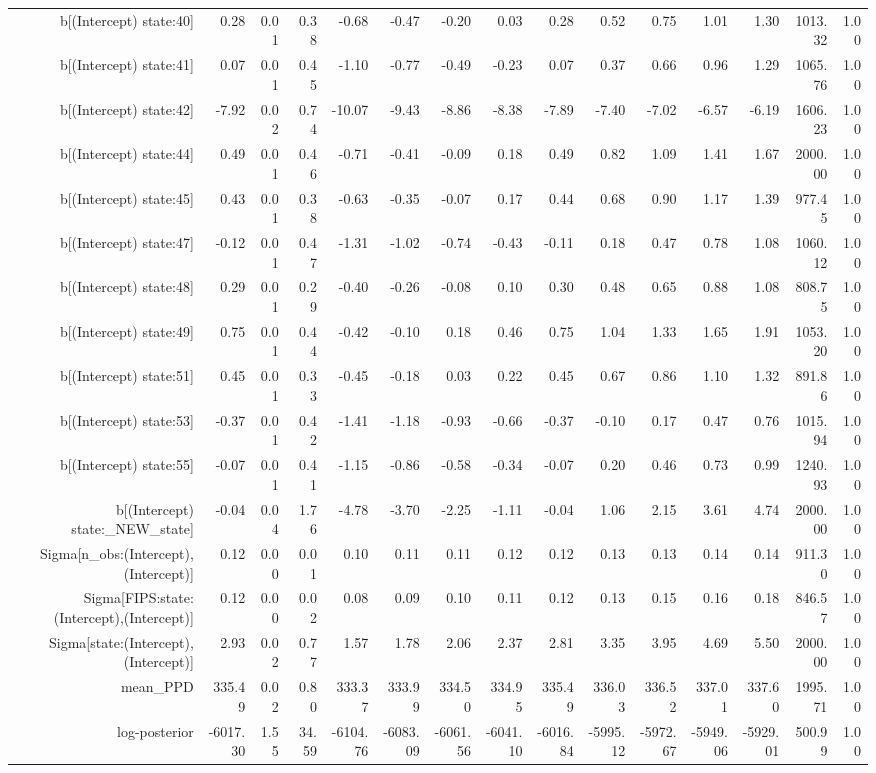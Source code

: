 \begin{table}[ht]
\begin{tabular}{rrrrrrrrrrrrrrr}
  b[(Intercept) state:40] & 0.28 & 0.01 & 0.38 & -0.68 & -0.47 & -0.20 & 0.03 & 0.28 & 0.52 & 0.75 & 1.01 & 1.30 & 1013.32 & 1.00 \\ 
  b[(Intercept) state:41] & 0.07 & 0.01 & 0.45 & -1.10 & -0.77 & -0.49 & -0.23 & 0.07 & 0.37 & 0.66 & 0.96 & 1.29 & 1065.76 & 1.00 \\ 
  b[(Intercept) state:42] & -7.92 & 0.02 & 0.74 & -10.07 & -9.43 & -8.86 & -8.38 & -7.89 & -7.40 & -7.02 & -6.57 & -6.19 & 1606.23 & 1.00 \\ 
  b[(Intercept) state:44] & 0.49 & 0.01 & 0.46 & -0.71 & -0.41 & -0.09 & 0.18 & 0.49 & 0.82 & 1.09 & 1.41 & 1.67 & 2000.00 & 1.00 \\ 
  b[(Intercept) state:45] & 0.43 & 0.01 & 0.38 & -0.63 & -0.35 & -0.07 & 0.17 & 0.44 & 0.68 & 0.90 & 1.17 & 1.39 & 977.45 & 1.00 \\ 
  b[(Intercept) state:47] & -0.12 & 0.01 & 0.47 & -1.31 & -1.02 & -0.74 & -0.43 & -0.11 & 0.18 & 0.47 & 0.78 & 1.08 & 1060.12 & 1.00 \\ 
  b[(Intercept) state:48] & 0.29 & 0.01 & 0.29 & -0.40 & -0.26 & -0.08 & 0.10 & 0.30 & 0.48 & 0.65 & 0.88 & 1.08 & 808.75 & 1.00 \\ 
  b[(Intercept) state:49] & 0.75 & 0.01 & 0.44 & -0.42 & -0.10 & 0.18 & 0.46 & 0.75 & 1.04 & 1.33 & 1.65 & 1.91 & 1053.20 & 1.00 \\ 
  b[(Intercept) state:51] & 0.45 & 0.01 & 0.33 & -0.45 & -0.18 & 0.03 & 0.22 & 0.45 & 0.67 & 0.86 & 1.10 & 1.32 & 891.86 & 1.00 \\ 
  b[(Intercept) state:53] & -0.37 & 0.01 & 0.42 & -1.41 & -1.18 & -0.93 & -0.66 & -0.37 & -0.10 & 0.17 & 0.47 & 0.76 & 1015.94 & 1.00 \\ 
  b[(Intercept) state:55] & -0.07 & 0.01 & 0.41 & -1.15 & -0.86 & -0.58 & -0.34 & -0.07 & 0.20 & 0.46 & 0.73 & 0.99 & 1240.93 & 1.00 \\ 
  b[(Intercept) state:\_NEW\_state] & -0.04 & 0.04 & 1.76 & -4.78 & -3.70 & -2.25 & -1.11 & -0.04 & 1.06 & 2.15 & 3.61 & 4.74 & 2000.00 & 1.00 \\ 
  Sigma[n\_obs:(Intercept),(Intercept)] & 0.12 & 0.00 & 0.01 & 0.10 & 0.11 & 0.11 & 0.12 & 0.12 & 0.13 & 0.13 & 0.14 & 0.14 & 911.30 & 1.00 \\ 
  Sigma[FIPS:state:(Intercept),(Intercept)] & 0.12 & 0.00 & 0.02 & 0.08 & 0.09 & 0.10 & 0.11 & 0.12 & 0.13 & 0.15 & 0.16 & 0.18 & 846.57 & 1.00 \\ 
  Sigma[state:(Intercept),(Intercept)] & 2.93 & 0.02 & 0.77 & 1.57 & 1.78 & 2.06 & 2.37 & 2.81 & 3.35 & 3.95 & 4.69 & 5.50 & 2000.00 & 1.00 \\ 
  mean\_PPD & 335.49 & 0.02 & 0.80 & 333.37 & 333.99 & 334.50 & 334.95 & 335.49 & 336.03 & 336.52 & 337.01 & 337.60 & 1995.71 & 1.00 \\ 
  log-posterior & -6017.30 & 1.55 & 34.59 & -6104.76 & -6083.09 & -6061.56 & -6041.10 & -6016.84 & -5995.12 & -5972.67 & -5949.06 & -5929.01 & 500.99 & 1.00 \\ 
   \hline
\end{tabular}
\end{table}
